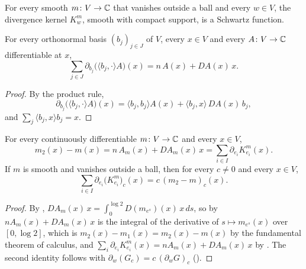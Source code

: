 \begin{definition}
\label{def:divergence-schwartz}
\leanok
{}
For every smooth $m \colon V \to \mathbb{C}$ that vanishes outside a ball and every $w \in V$, the
divergence kernel $K^m_w$, smooth with compact support, is a Schwartz function.
\end{definition}

\begin{lemma}
\label{lem:radial-divergence}
\leanok
For every orthonormal basis $(b_j)_{j \in J}$ of $V$, every $x \in V$ and every
$A \colon V \to \mathbb{C}$ differentiable at $x$,
\[
  \sum_{j \in J} \partial_{b_j} \bigl(\langle b_j, \cdot \rangle A\bigr)(x)
    = n \, A(x) + DA(x) \, x .
\]
\end{lemma}

\begin{proof}
\leanok
By the product rule,
\[
  \partial_{b_j} \bigl(\langle b_j, \cdot \rangle A\bigr)(x)
    = \langle b_j, b_j \rangle A(x) + \langle b_j, x \rangle \, DA(x) \, b_j ,
\]
and $\sum_j \langle b_j, x \rangle b_j = x$.
\end{proof}

\begin{theorem}
\label{thm:dilation-divergence}
\leanok
{}
For every continuously differentiable $m \colon V \to \mathbb{C}$ and every $x \in V$,
\[
  m_2(x) - m(x) = n \, A_m(x) + D A_m(x) \, x = \sum_{i \in I} \partial_{e_i} K^m_{e_i}(x) .
\]
If $m$ is smooth and vanishes outside a ball, then for every $c \neq 0$ and every $x \in V$,
\[
  \sum_{i \in I} \partial_{e_i} \bigl(K^m_{e_i}\bigr)_c (x) = c \, (m_2 - m)_c(x) .
\]
\end{theorem}

\begin{proof}
\leanok
By ,
$D A_m(x) \, x = \int_0^{\log 2} D(m_{e^s})(x) \, x \, ds$,
so by  $n A_m(x) + D A_m(x) \, x$ is the integral of the
derivative of $s \mapsto m_{e^s}(x)$ over $[0, \log 2]$, which is
$m_2(x) - m_1(x) = m_2(x) - m(x)$ by the fundamental theorem of calculus, and
$\sum_i \partial_{e_i} K^m_{e_i}(x) = n A_m(x) + D A_m(x) \, x$ by .
The second identity follows with $\partial_w (G_c) = c \, (\partial_w G)_c$
().
\end{proof}

